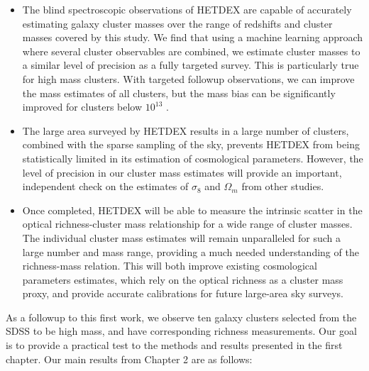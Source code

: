 \begin{itemize}
	\item The blind spectroscopic observations of HETDEX are capable of accurately estimating galaxy cluster masses over the range of redshifts and cluster masses covered by this study. We find that using a machine learning approach where several cluster observables are combined, we estimate cluster masses to a similar level of precision as a fully targeted survey. This is particularly true for high mass clusters. With targeted followup observations, we can improve the mass estimates of all clusters, but the mass bias can be significantly improved for clusters below $10^{13}$ \Msol.
	
	\item The large area surveyed by HETDEX results in a large number of clusters, combined with the sparse sampling of the sky, prevents HETDEX from being statistically limited in its estimation of cosmological parameters. However, the level of precision in our cluster mass estimates will provide an important, independent check on the estimates of $\sigma_8$ and $\Omega_m$ from other studies.
	
	\item Once completed, HETDEX will be able to measure the intrinsic scatter in the optical richness-cluster mass relationship for a wide range of cluster masses. The individual cluster mass estimates will remain unparalleled for such a large number and mass range, providing a much needed understanding of the richness-mass relation. This will both improve existing cosmological parameters estimates, which rely on the optical richness as a cluster mass proxy, and provide accurate calibrations for future large-area sky surveys.  
\end{itemize}

As a followup to this first work, we observe ten galaxy clusters selected from the SDSS to be high mass, and have corresponding richness measurements. Our goal is to provide a practical test to the methods and results presented in the first chapter. Our main results from Chapter 2 are as follows:

